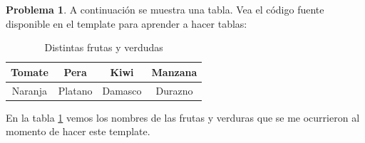 \documentclass[10pt]{article}
\theoremstyle{definition}
\theoremstyle{remark}
\theoremstyle{definition}
\newtheorem{prob}{Problema}
\begin{document}
\begin{prob} A continuación se muestra una tabla. Vea el código fuente disponible en el template para aprender a hacer tablas:

\begin{table}[H]
	\centering
	\begin{tabular}{||c|c|c|c||}  %
		\hline  %
		Tomate & Pera & Kiwi & Manzana \\
		\hline
		Naranja & Platano & Damasco & Durazno \\
		\hline
	\end{tabular}
	\caption{Distintas frutas y verdudas}
	\label{tab:frutas}
\end{table}
En la tabla \ref{tab:frutas} vemos los nombres de las frutas y verduras que se me ocurrieron al momento de hacer este template.

\end{prob}
\end{document}
